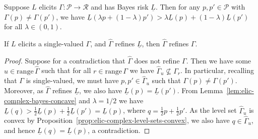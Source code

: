 \documentclass[anon,12pt]{colt2021} %
\newcommand{\range}{\mathrm{range}\,}
\newcommand{\R}{\mathcal{R}}
\renewcommand{\P}{\mathcal{P}}
\newcommand{\lbar}{\underline{L}} %
\begin{document}
\begin{lemma}
  \label{lem:elic-complex-bayes-concave}
  Suppose $L$ elicits $\Gamma:\P\to\R$ and has Bayes risk $\lbar$.
  Then for any $p,p'\in\P$ with $\Gamma(p)\neq\Gamma(p')$, we have $\lbar(\lambda p + (1-\lambda) p') > \lambda \lbar(p) + (1-\lambda) \lbar(p')$ for all $\lambda\in(0,1)$.
\end{lemma}

\begin{lemma}
  \label{lem:bayes-risk-lower-bound}
  If $L$ elicits a single-valued $\Gamma$, and $\hat\Gamma$ refines $\lbar$, then $\hat\Gamma$ refines $\Gamma$.
\end{lemma}
\begin{proof}
  Suppose for a contradiction that $\hat\Gamma$ does not refine $\Gamma$.
  Then we have some $u\in\range\hat\Gamma$ such that for all $r\in\range\Gamma$ we have $\hat\Gamma_u \not\subseteq \Gamma_r$.
  In particular, recalling that $\Gamma$ is single-valued, we must have $p,p'\in\hat\Gamma_u$ such that $\Gamma(p) \neq \Gamma(p')$.
  Moreover, as $\hat\Gamma$ refines $\lbar$, we also have $\lbar(p) = \lbar(p')$.
  From Lemma~\ref{lem:elic-complex-bayes-concave} and $\lambda=1/2$ we have $\lbar(q) > \tfrac 1 2 \lbar(p) + \tfrac 1 2 \lbar(p') = \lbar(p)$, where $q = \tfrac 1 2 p + \tfrac 1 2 p'$.
  As the level set $\hat\Gamma_u$ is convex by Proposition~\ref{prop:elic-complex-level-sets-convex}, we also have $q \in \hat\Gamma_u$, and hence $\lbar(q)=\lbar(p)$, a contradiction.
\end{proof}
\end{document}

